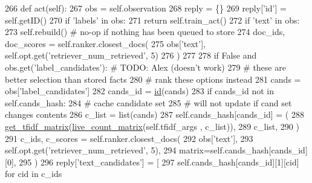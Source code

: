 \begin{DoxyCode}
266     \textcolor{keyword}{def }act(self):
267         obs = self.observation
268         reply = \{\}
269         reply[\textcolor{stringliteral}{'id'}] = self.getID()
270         \textcolor{keywordflow}{if} \textcolor{stringliteral}{'labels'} \textcolor{keywordflow}{in} obs:
271             \textcolor{keywordflow}{return} self.train\_act()
272         \textcolor{keywordflow}{if} \textcolor{stringliteral}{'text'} \textcolor{keywordflow}{in} obs:
273             self.rebuild()  \textcolor{comment}{# no-op if nothing has been queued to store}
274             doc\_ids, doc\_scores = self.ranker.closest\_docs(
275                 obs[\textcolor{stringliteral}{'text'}], self.opt.get(\textcolor{stringliteral}{'retriever\_num\_retrieved'}, 5)
276             )
277 
278             \textcolor{keywordflow}{if} \textcolor{keyword}{False} \textcolor{keywordflow}{and} obs.get(\textcolor{stringliteral}{'label\_candidates'}):  \textcolor{comment}{# TODO: Alex (doesn't work)}
279                 \textcolor{comment}{# these are better selection than stored facts}
280                 \textcolor{comment}{# rank these options instead}
281                 cands = obs[\textcolor{stringliteral}{'label\_candidates'}]
282                 cands\_id = \hyperlink{namespacegenerate__task__list_a78e725c3dd7e8fbdb5c3044ec1bc3a81}{id}(cands)
283                 \textcolor{keywordflow}{if} cands\_id \textcolor{keywordflow}{not} \textcolor{keywordflow}{in} self.cands\_hash:
284                     \textcolor{comment}{# cache candidate set}
285                     \textcolor{comment}{# will not update if cand set changes contents}
286                     c\_list = list(cands)
287                     self.cands\_hash[cands\_id] = (
288                         \hyperlink{namespaceparlai_1_1agents_1_1tfidf__retriever_1_1build__tfidf_acce651a5b40c5a3b4009181f22c69eaa}{get\_tfidf\_matrix}(\hyperlink{namespaceparlai_1_1agents_1_1tfidf__retriever_1_1build__tfidf_af51dc8629608fd04435739ba76b1e8f2}{live\_count\_matrix}(self.tfidf\_args
      , c\_list)),
289                         c\_list,
290                     )
291                 c\_ids, c\_scores = self.ranker.closest\_docs(
292                     obs[\textcolor{stringliteral}{'text'}],
293                     self.opt.get(\textcolor{stringliteral}{'retriever\_num\_retrieved'}, 5),
294                     matrix=self.cands\_hash[cands\_id][0],
295                 )
296                 reply[\textcolor{stringliteral}{'text\_candidates'}] = [
297                     self.cands\_hash[cands\_id][1][cid] \textcolor{keywordflow}{for} cid \textcolor{keywordflow}{in} c\_ids

\end{DoxyCode}
